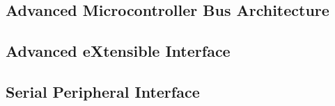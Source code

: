 \subsection{Advanced Microcontroller Bus Architecture}

\subsection{Advanced eXtensible Interface}

\subsection{Serial Peripheral Interface}
